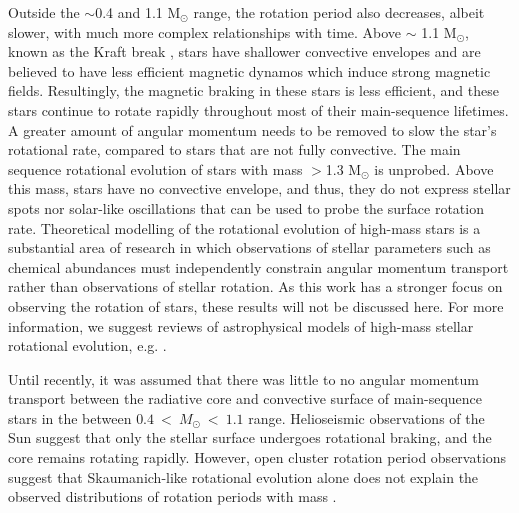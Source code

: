 Outside the $\sim$0.4 and 1.1 M$_{\odot}$ range, the rotation period also decreases, albeit slower, with much more complex relationships with time.
Above $\sim$ 1.1 M$_{\odot}$, known as the Kraft break \citep{kraft_studies_1967}, stars have shallower convective envelopes and are believed to have less efficient magnetic dynamos which induce strong magnetic fields.
Resultingly, the magnetic braking in these stars is less efficient, and these stars continue to rotate rapidly throughout most of their main-sequence lifetimes. 
A greater amount of angular momentum needs to be removed to slow the star's rotational rate, compared to stars that are not fully convective.
The main sequence rotational evolution of stars with mass $>$1.3 M$_{\odot}$ is unprobed.
Above this mass, stars have no convective envelope, and thus, they do not express stellar spots nor solar-like oscillations that can be used to probe the surface rotation rate.
Theoretical modelling of the rotational evolution of high-mass stars is a substantial area of research in which observations of stellar parameters such as chemical abundances must independently constrain angular momentum transport rather than observations of stellar rotation.
As this work has a stronger focus on observing the rotation of stars, these results will not be discussed here.
For more information, we suggest reviews of astrophysical models of high-mass stellar rotational evolution, e.g. \citet{heger_presupernova_1998,maeder_evolution_2000,maeder_physics_2009}.

Until recently, it was assumed that there was little to no angular momentum transport between the radiative core and convective surface of main-sequence stars in the between $0.4 \ < \ M_{\odot} \  < \ 1.1$ range. 
Helioseismic observations of the Sun suggest that only the stellar surface undergoes rotational braking, and the core remains rotating rapidly.
However, open cluster rotation period observations suggest that Skaumanich-like rotational evolution alone does not explain the observed distributions of rotation periods with mass \citep{spada_competing_2020}.

